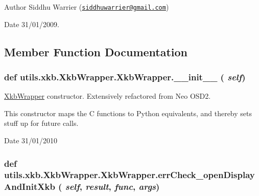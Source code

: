 \begin{DoxyAuthor}{Author}
Siddhu Warrier (\href{mailto:siddhuwarrier@gmail.com}{\tt siddhuwarrier@gmail.com}) 
\end{DoxyAuthor}
\begin{DoxyDate}{Date}
31/01/2009. 
\end{DoxyDate}


\subsection{Member Function Documentation}
\hypertarget{classutils_1_1xkb_1_1XkbWrapper_1_1XkbWrapper_a5abce40ea4fb1f22aea1c27c9d49f945}{
\subsubsection[{\_\-\_\-init\_\-\_\-}]{\setlength{\rightskip}{0pt plus 5cm}def utils.xkb.XkbWrapper.XkbWrapper.\_\-\_\-init\_\-\_\- ( {\em self})}}
\label{classutils_1_1xkb_1_1XkbWrapper_1_1XkbWrapper_a5abce40ea4fb1f22aea1c27c9d49f945}


\hyperlink{classutils_1_1xkb_1_1XkbWrapper_1_1XkbWrapper}{XkbWrapper} constructor. Extensively refactored from Neo OSD2.

This constructor maps the C functions to Python equivalents, and thereby sets stuff up for future calls.

\begin{DoxyDate}{Date}
31/01/2010 
\end{DoxyDate}
\hypertarget{classutils_1_1xkb_1_1XkbWrapper_1_1XkbWrapper_af421963b863a37d59c534abafc6f71da}{
\subsubsection[{errCheck\_\-openDisplayAndInitXkb}]{\setlength{\rightskip}{0pt plus 5cm}def utils.xkb.XkbWrapper.XkbWrapper.errCheck\_\-openDisplayAndInitXkb ( {\em self}, \/   {\em result}, \/   {\em func}, \/   {\em args})}}
\label{classutils_1_1xkb_1_1XkbWrapper_1_1XkbWrapper_af421963b863a37d59c534abafc6f71da}


